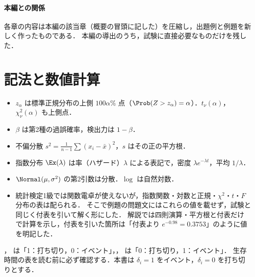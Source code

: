 \paragraph{本編との関係}
各章の内容は本編の該当章（概要の冒頭に記した）を圧縮し，出題例と例題を新しく作ったものである．
本編の導出のうち，試験に直接必要なものだけを残した．

\section*{記法と数値計算}
\begin{itemize}
\item $z_\alpha$ は標準正規分布の上側 $100\alpha\%$ 点（$\Prob(Z>z_\alpha)=\alpha$）．$t_\nu(\alpha)$，$\chi^2_\nu(\alpha)$ も上側点．
\item $\beta$ は第2種の過誤確率，検出力は $1-\beta$．
\item 不偏分散 $s^2=\frac1{n-1}\sum(x_i-\bar x)^2$，$s$ はその正の平方根．
\item 指数分布 $\Ex(\lambda)$ は率（ハザード）$\lambda$ による表記で，密度 $\lambda e^{-\lambda t}$，平均 $1/\lambda$．
\item $\Normal(\mu,\sigma^2)$ の第2引数は分散．$\log$ は自然対数．
\item 統計検定1級では関数電卓が使えないが，指数関数・対数と正規・$\chi^2$・$t$・$F$ 分布の表は配られる．
      そこで例題の問題文にはこれらの値を載せず，試験と同じく付表を引いて解く形にした．
      解説では四則演算・平方根と付表だけで計算を示し，付表を引いた箇所は「付表より $e^{-0.98}=0.3753$」のように値を明記した．
\end{itemize}

\begin{warnbox}[打ち切り指示変数の向きは年度で逆]
， は「1：打ち切り，0：イベント」，， は「0：打ち切り，1：イベント」．
生存時間の表を読む前に必ず確認する．本書は $\delta_i=1$ をイベント，$\delta_i=0$ を打ち切りとする．
\end{warnbox}

